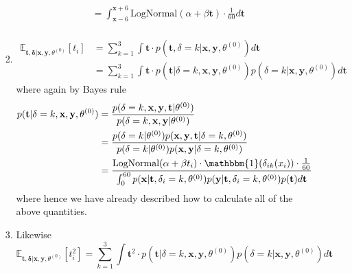 \documentclass{article}
\begin{document}
\begin{itemize}
\begin{enumerate}[label=(\alph*)]
\begin{enumerate}[label=(\arabic*)]
\begin{align*}
            &=  \int_{\mathbf{x} - 6}^{\mathbf{x} + 6}\text{LogNormal}(\alpha + \beta \mathbf{t}) \cdot \frac{1}{60} d\mathbf{t} \\
          \end{align*}
        \item
          \begin{align*}
            \mathbb{E}_{\mathbf{t}, \mathbf{\delta} | \mathbf{x}, \mathbf{y}, \theta^{(0)}}[t_i] &= \sum_{k=1}^{3}\int \mathbf{t} \cdot p(\mathbf{t}, \delta = k| \mathbf{x}, \mathbf{y}, \theta^{(0)}) d\mathbf{t}\\
            &= \sum_{k=1}^{3}\int \mathbf{t} \cdot p(\mathbf{t}| \delta = k, \mathbf{x}, \mathbf{y}, \theta^{(0)}) p(\delta = k | \mathbf{x}, \mathbf{y}, \theta^{(0)}) d\mathbf{t}
          \end{align*}
          where again by Bayes rule
          \begin{align*}
            p(\mathbf{t}| \delta = k, \mathbf{x}, \mathbf{y}, \theta^{(0)}) &= \frac{p(\delta = k, \mathbf{x}, \mathbf{y}, \mathbf{t} | \theta^{(0)})}{p(\delta = k, \mathbf{x}, \mathbf{y} | \theta^{(0)})} \\
            &= \frac{p(\delta = k | \theta^{(0)}) p( \mathbf{x}, \mathbf{y}, \mathbf{t} | \delta = k, \theta^{(0)})}{p(\delta = k| \theta^{(0)}) p( \mathbf{x}, \mathbf{y} | \delta=k, \theta^{(0)})} \\
            &= \frac{\text{LogNormal}(\alpha + \beta t_i) \cdot \mathbbm{1}(\delta_{ik}(x_i))\cdot \frac{1}{60}}{\int_{0}^{60} p( \mathbf{x} | \mathbf{t}, \delta_i = k,  \theta^{(0)}) p( \mathbf{y} | \mathbf{t}, \delta_i = k,  \theta^{(0)}) p( \mathbf{t})  d\mathbf{t}}
          \end{align*}
          where hence we have already described how to calculate all of the above quantities.
        \item Likewise
          $$\mathbb{E}_{\mathbf{t}, \mathbf{\delta} | \mathbf{x}, \mathbf{y}, \theta^{(0)}}[t_i^2] = \sum_{k=1}^{3}\int \mathbf{t}^2 \cdot p(\mathbf{t}| \delta = k, \mathbf{x}, \mathbf{y}, \theta^{(0)}) p(\delta = k | \mathbf{x}, \mathbf{y}, \theta^{(0)})d\mathbf{t} $$
      \end{enumerate}


\end{enumerate}
\end{itemize}
\end{document}
